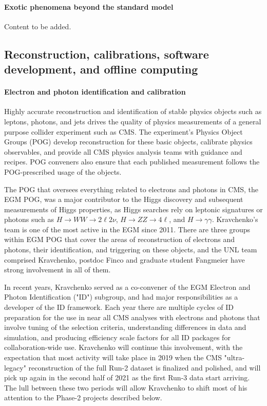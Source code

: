 \paragraph{Exotic phenomena beyond the standard model}
 Content to be added.


\subsection{Reconstruction, calibrations, software development, and offline computing}

\paragraph{Electron and photon identification and calibration}
Highly accurate reconstruction and identification of stable physics objects such as leptons, photons, and jets drives the quality of physics measurements of a general purpose collider experiment such as CMS. The experiment's Physics Object Groups (POG) develop reconstruction for these basic objects, calibrate physics observables, and provide all CMS physics analysis teams  with guidance and recipes. POG conveners also ensure that each published measurement follows the POG-prescribed usage of the objects. 

The POG that oversees everything related to electrons and photons in CMS, the EGM POG,  was a major contributor to the Higgs discovery and subsequent measurements of Higgs properties, as Higgs searches rely on leptonic signatures or photons such as $H\rightarrow WW\rightarrow 2\ell 2\nu$, $H\rightarrow ZZ\rightarrow 4\ell$, and $H\rightarrow \gamma\gamma$. Kravchenko's team is one of the most active in the EGM since 2011. There are three groups within EGM POG that cover the areas of reconstruction of electrons and photons, their identification, and triggering on these objects, and the UNL team comprised Kravchenko, postdoc Finco and graduate student Fangmeier have strong involvement in all of them. 

In recent years, Kravchenko served as a co-convener of the EGM Electron and Photon Identification ("ID") subgroup, and had major responsibilities as a developer of the ID framework. Each year there are multiple cycles of ID preparation for the use in near all CMS analyses with electrons and photons that involve tuning of the selection criteria, understanding differences in data and simulation, and producing efficiency scale factors for all ID packages for collaboration-wide use. Kravchenko will continue this involvement, with the expectation that most activity will take place in 2019 when the CMS "ultra-legacy" reconstruction of the full Run-2 dataset is finalized and polished, and will pick up again in the second half of 2021 as the first Run-3 data start arriving. The lull between these two periods will allow Kravchenko to shift most of his attention to the Phase-2 projects described below. 


